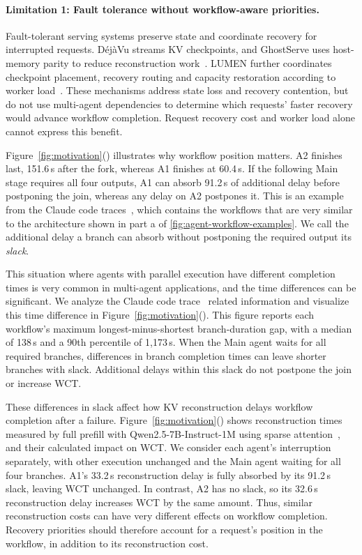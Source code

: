 \paragraph{Limitation 1: Fault tolerance without workflow-aware priorities.}
Fault-tolerant serving systems preserve state and coordinate recovery
for interrupted requests. D\'ej\`aVu streams KV checkpoints, and GhostServe
uses host-memory parity to reduce reconstruction
work~\cite{strati2024dejavu,jayakody2026ghostserve}.
LUMEN further coordinates checkpoint placement, recovery routing and
capacity restoration according to worker load~\cite{cao2026lumen}.
These mechanisms address state loss and recovery contention, but do not
use multi-agent dependencies to determine which requests' faster
recovery would advance workflow completion. Request recovery cost and
worker load alone cannot express this benefit.

\label{sec:motivation-workflow}
Figure~\ref{fig:motivation}() illustrates
why workflow position matters. A2 finishes last, 151.6\,s after the fork,
whereas A1 finishes at 60.4\,s. If the following Main stage requires all
four outputs, A1 can absorb 91.2\,s of additional delay before postponing
the join, whereas any delay on A2 postpones it. This is an example from the Claude code traces~\cite{semianalysis2026cctraces}, which contains the workflows that are very similar to the architecture shown in part a of \ref{fig:agent-workflow-examples}. We call the additional
delay a branch can absorb without postponing the required output its
\emph{slack}. 

This situation where agents with parallel execution have different completion times is very common in multi-agent applications, and the time differences can be significant. We analyze the Claude code trace~\cite{semianalysis2026cctraces} related information and visualize this time difference in Figure~\ref{fig:motivation}().
This figure reports each workflow's maximum longest-minus-shortest branch-duration gap,
with a median of 138\,s and a 90th percentile of 1,173\,s. When the Main agent waits for all required branches, differences in branch completion times can leave shorter branches with slack. Additional delays within this slack do not postpone the join or
increase WCT.

These differences in slack affect how KV reconstruction delays workflow
completion after a failure.
Figure~\ref{fig:motivation}()
shows reconstruction times measured by full prefill with
Qwen2.5-7B-Instruct-1M using sparse
attention~\cite{qwen2025qwen25oneM,jiang2024minference},
and their calculated impact on WCT.
We consider each agent's interruption separately, with other execution
unchanged and the Main agent waiting for all four branches.
A1's 33.2\,s reconstruction delay is fully absorbed by its 91.2\,s slack,
leaving WCT unchanged. In contrast, A2 has no slack, so its 32.6\,s
reconstruction delay increases WCT by the same amount.
Thus, similar reconstruction costs can have very different effects
on workflow completion. Recovery priorities should therefore account
for a request's position in the workflow, in addition to its
reconstruction cost.

